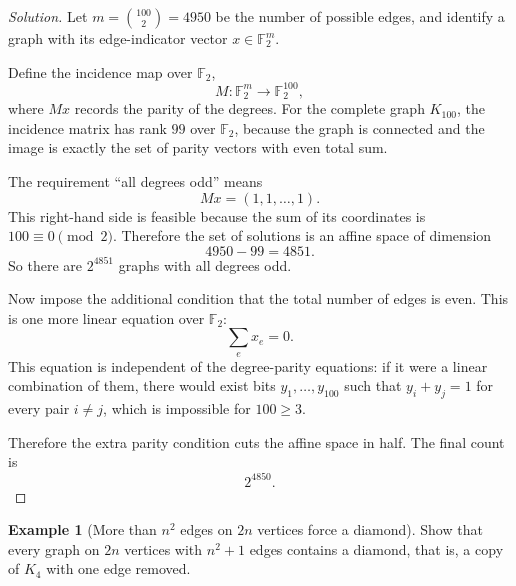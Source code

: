 \documentclass[11pt]{article}
\theoremstyle{definition}
\newtheorem{example}{Example}[section]
\begin{document}
\begin{proof}[Solution]
Let $m=\binom{100}{2}=4950$ be the number of possible edges, and identify a graph with its edge-indicator vector $x\in \mathbb{F}_2^m$.

Define the incidence map over $\mathbb{F}_2$,
\[
M:\mathbb{F}_2^m \to \mathbb{F}_2^{100},
\]
where $Mx$ records the parity of the degrees. For the complete graph $K_{100}$, the incidence matrix has rank $99$ over $\mathbb{F}_2$, because the graph is connected and the image is exactly the set of parity vectors with even total sum.

The requirement ``all degrees odd'' means
\[
Mx=(1,1,\dots,1).
\]
This right-hand side is feasible because the sum of its coordinates is $100\equiv 0 \pmod 2$. Therefore the set of solutions is an affine space of dimension
\[
4950-99=4851.
\]
So there are $2^{4851}$ graphs with all degrees odd.

Now impose the additional condition that the total number of edges is even. This is one more linear equation over $\mathbb{F}_2$:
\[
\sum_{e} x_e = 0.
\]
This equation is independent of the degree-parity equations: if it were a linear combination of them, there would exist bits $y_1,\dots,y_{100}$ such that $y_i+y_j=1$ for every pair $i\neq j$, which is impossible for $100\ge 3$.

Therefore the extra parity condition cuts the affine space in half. The final count is
\[
\boxed{2^{4850}}.
\]
\end{proof}

\begin{example}[More than $n^2$ edges on $2n$ vertices force a diamond]
Show that every graph on $2n$ vertices with $n^2+1$ edges contains a diamond, that is, a copy of $K_4$ with one edge removed.
\end{example}
\end{document}
